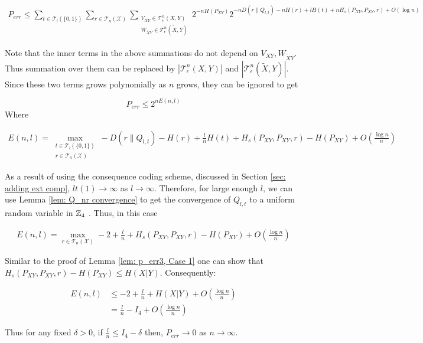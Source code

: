 \begin{align}
P_{err}\leq \sum_{t\in \mathcal{T}_l(\{ 0,1\})}\sum_{r \in \mathcal{T}_n(\mathcal{X}) } \sum_{\substack{V_{XY}\in \mathcal{T}_\epsilon^n(X,Y)\\ W_{\tilde{X}Y}\in  \mathcal{T}_\epsilon^n(\tilde{X},Y) }}   2^{-nH(P_{XY})} 2^{-nD(r\| Q_{l,t})-nH(r)+lH(t)+nH_{s}(P_{XY},P_{XY},r)+O(\log n)}
\end{align} 

 Note that the inner terms in the above summations do not depend on $V_{XY}, W_{\tilde{X}Y}$. Thus summation over them can be replaced by $|\mathcal{T}_\epsilon^n(X,Y)|$ and $|\mathcal{T}_\epsilon^n(\tilde{X},Y)|$. Since these two terms grows polynomially as $n$ grows, they can be ignored to get
 
 \begin{equation*}
P_{err}\leq 2^{nE(n,l)} 
 \end{equation*}
 Where 

\begin{align*}
E(n,l)=\max_{\substack{t\in \mathcal{T}_l(\{ 0,1\}) \\ r\in\mathcal{T}_n(\mathcal{X})}} -D(r\| Q_{l,t})-H(r)+\frac{l}{n} H(t)+H_{s}(P_{XY},P_{XY},r)-H(P_{XY})+O( \frac{\log n}{n})
\end{align*}


As a result of using the consequence coding scheme, discussed in Section \ref{sec: adding ext comp}, $l t(1)\rightarrow \infty$ as $l\rightarrow \infty$. Therefore, for large enough $l$, we can use Lemma \ref{lem: Q_nr convergence} to get the convergence of $Q_{l,t}$ to a uniform random variable in $\mathbb{Z}_4$ . Thus, in this case 
 
\begin{align*}
E(n,l)=\max_{ r\in\mathcal{T}_n(\mathcal{X})} -2+\frac{l}{n} +H_{s}(P_{XY},P_{XY},r)-H(P_{XY})+O( \frac{\log n}{n})
\end{align*} 
 
Similar to the proof of Lemma \ref{lem: p_err3, Case 1} one can show that $H_{s}(P_{XY},P_{XY},r)-H(P_{XY}) \leq H(X|Y)$. Consequently:

\begin{align*}
E(n,l)&\leq -2+\frac{l}{n} +H(X|Y)+O( \frac{\log n}{n})\\
&=\frac{l}{n}-I_4+O( \frac{\log n}{n})
\end{align*} 

Thus for any fixed $\delta >0$, if $\frac{l}{n}\leq I_4-\delta$ then, $P_{err} \rightarrow 0$ as $n\rightarrow \infty$. 

